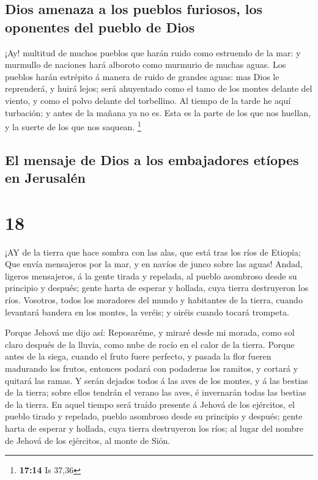 \hypertarget{dios-amenaza-a-los-pueblos-furiosos-los-oponentes-del-pueblo-de-dios}{%
\subsection{Dios amenaza a los pueblos furiosos, los oponentes del
pueblo de
Dios}\label{dios-amenaza-a-los-pueblos-furiosos-los-oponentes-del-pueblo-de-dios}}

 ¡Ay! multitud de muchos pueblos que harán ruido como
estruendo de la mar: y murmullo de naciones hará alboroto como murmurio
de muchas aguas.  Los pueblos harán estrépito á manera de
ruido de grandes aguas: mas Dios le reprenderá, y huirá lejos; será
ahuyentado como el tamo de los montes delante del viento, y como el
polvo delante del torbellino.  Al tiempo de la tarde he
aquí turbación; y antes de la mañana ya no es. Esta es la parte de los
que nos huellan, y la suerte de los que nos saquean. \footnote{\textbf{17:14}
  Is 37,36}

\hypertarget{el-mensaje-de-dios-a-los-embajadores-etuxedopes-en-jerusaluxe9n}{%
\subsection{El mensaje de Dios a los embajadores etíopes en
Jerusalén}\label{el-mensaje-de-dios-a-los-embajadores-etuxedopes-en-jerusaluxe9n}}

\hypertarget{section-17}{%
\section{18}\label{section-17}}

 ¡AY de la tierra que hace sombra con las alas, que está
tras los ríos de Etiopía;  Que envía mensajeros por la mar,
y en navíos de junco sobre las aguas! Andad, ligeros mensajeros, á la
gente tirada y repelada, al pueblo asombroso desde su principio y
después; gente harta de esperar y hollada, cuya tierra destruyeron los
ríos.  Vosotros, todos los moradores del mundo y habitantes
de la tierra, cuando levantará bandera en los montes, la veréis; y
oiréis cuando tocará trompeta.

 Porque Jehová me dijo así: Reposaréme, y miraré desde mi
morada, como sol claro después de la lluvia, como nube de rocío en el
calor de la tierra.  Porque antes de la siega, cuando el
fruto fuere perfecto, y pasada la flor fueren madurando los frutos,
entonces podará con podaderas los ramitos, y cortará y quitará las
ramas.  Y serán dejados todos á las aves de los montes, y á
las bestias de la tierra; sobre ellos tendrán el verano las aves, é
invernarán todas las bestias de la tierra.  En aquel tiempo
será traído presente á Jehová de los ejércitos, el pueblo tirado y
repelado, pueblo asombroso desde su principio y después; gente harta de
esperar y hollada, cuya tierra destruyeron los ríos; al lugar del nombre
de Jehová de los ejércitos, al monte de Sión.

